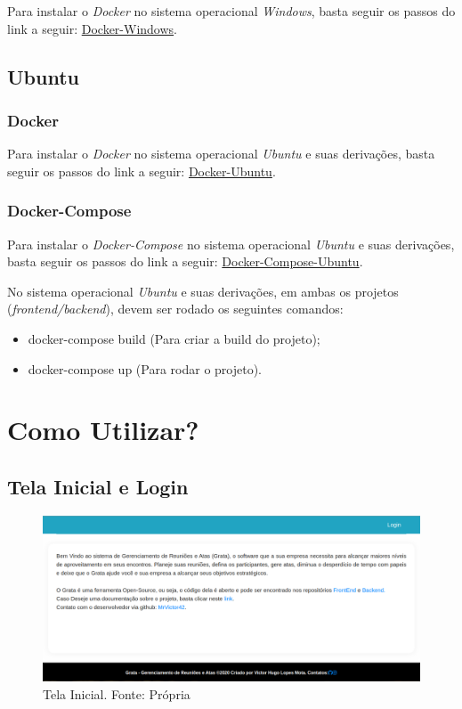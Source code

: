 Para instalar o \textit{Docker} no sistema operacional \textit{Windows}, basta seguir os passos do link a seguir: \href{https://docs.docker.com/docker-for-windows/install/}{Docker-Windows}.

\subsection{Ubuntu}

\subsubsection{Docker}

Para instalar o \textit{Docker} no sistema operacional \textit{Ubuntu} e suas derivações, basta seguir os passos do link a seguir: \href{https://www.digitalocean.com/community/tutorials/how-to-install-and-use-docker-on-ubuntu-20-04}{Docker-Ubuntu}.

\subsubsection{Docker-Compose}

Para instalar o \textit{Docker-Compose} no sistema operacional \textit{Ubuntu} e suas derivações, basta seguir os passos do link a seguir: \href{https://www.digitalocean.com/community/tutorials/how-to-install-and-use-docker-compose-on-ubuntu-20-04-pt}{Docker-Compose-Ubuntu}.

No sistema operacional \textit{Ubuntu} e suas derivações, em ambas os projetos (\textit{frontend/backend}), devem ser rodado os seguintes comandos: 
\begin{itemize}
    \item docker-compose build (Para criar a build do projeto);
    \item docker-compose up (Para rodar o projeto).
\end{itemize}

\section{Como Utilizar?}

\subsection{Tela Inicial e Login}

\begin{figure}[H]
    \centering
    \includegraphics[width=1.0\textwidth]{figuras/tela_inicial.png}
    \caption{Tela Inicial. Fonte: Própria}
    \label{img:tela_inicial}
\end{figure}

